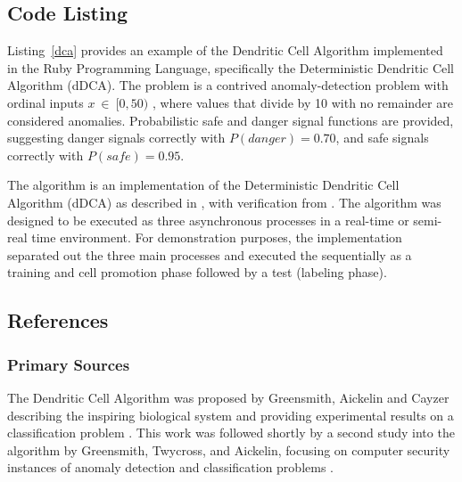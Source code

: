 \subsection{Code Listing}
Listing~\ref{dca} provides an example of the Dendritic Cell Algorithm implemented in the Ruby Programming Language, specifically the Deterministic Dendritic Cell Algorithm (dDCA).
The problem is a contrived anomaly-detection problem with ordinal inputs $x\ \in\ [0,50)$ , where values that divide by 10 with no remainder are considered anomalies. Probabilistic safe and danger signal functions are provided, suggesting danger signals correctly with $P(danger)=0.70$, and safe signals correctly with $P(safe)=0.95$.

The algorithm is an implementation of the Deterministic Dendritic Cell Algorithm (dDCA) as described in \cite{Stibor2009, Greensmith2008}, with verification from \cite{Greensmith2006a}. The algorithm was designed to be executed as three asynchronous processes in a real-time or semi-real time environment. For demonstration purposes, the implementation separated out the three main processes and executed the sequentially as a training and cell promotion phase followed by a test (labeling phase).



\subsection{References}

% 
% 
\subsubsection{Primary Sources}
The Dendritic Cell Algorithm was proposed by Greensmith, Aickelin and Cayzer describing the inspiring biological system and providing experimental results on a classification problem \cite{Greensmith2005}.
This work was followed shortly by a second study into the algorithm by Greensmith, Twycross, and Aickelin, focusing on computer security instances of anomaly detection and classification problems \cite{Greensmith2006}.

